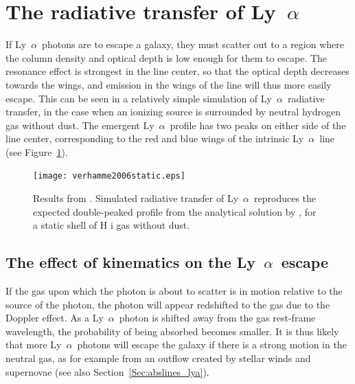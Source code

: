 \documentclass[a4wide,12pt]{book}
\newcommand{\lya}{Ly~${\alpha}$}
\begin{document}
{\section{The radiative transfer of \lya}

If \lya\ photons are to escape a galaxy, they must scatter out to a region where the column density and optical depth is low enough for them to escape. The resonance effect is strongest in the line center, so that the optical depth decreases towards the wings, and emission in the wings of the line will thus more easily escape. This can be seen in a relatively simple simulation of \lya\ radiative transfer, in the case when an ionizing source is surrounded by neutral hydrogen gas without dust. The emergent \lya\ profile has two peaks on either side of the line center, corresponding to the red and blue wings of the intrinsic \lya\ line (see Figure~\ref{Fig:verhamme2006static}).


\begin{figure}
   \centering
   \texttt{[image: verhamme2006static.eps]}
   \caption{Results from \citet{verhamme-2006}. Simulated radiative transfer of \lya\ reproduces the expected double-peaked profile from the analytical solution by \citet{neufeld1990}, for a static shell of H {\sc i} gas without dust.}
              \label{Fig:verhamme2006static}
    \end{figure}

\subsection{The effect of kinematics on the \lya\ escape}\label{Sec:intro_kinematic_Lya}

If the gas upon which the photon is about to scatter is in motion relative to the source of the photon, the photon will appear redshifted to the gas due to the Doppler effect. As a \lya\ photon is shifted away from the gas rest-frame wavelength, the probability of being absorbed becomes smaller. It is thus likely that more \lya\ photons will escape the galaxy if there is a strong motion in the neutral gas, as for example from an outflow created by stellar winds and supernovae (see also Section~\ref{Sec:abslines_lya}).

}
\end{document}
